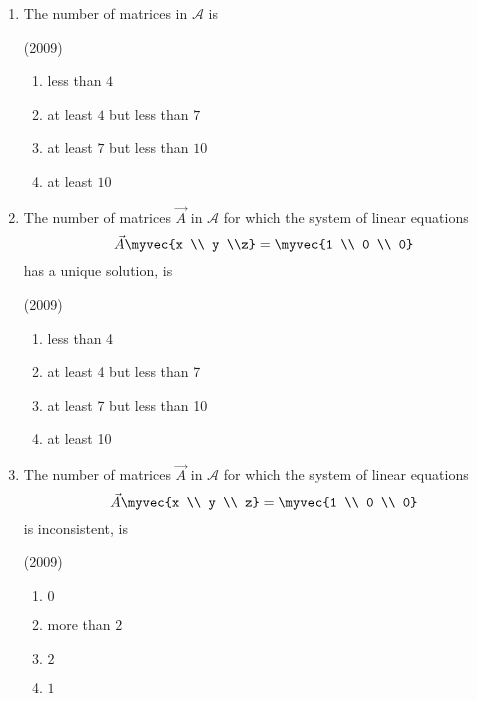 \begin{enumerate}
	\begin{enumerate}
		\item The number of matrices in $\mathcal{A}$ is

			\hfill(2009)

			\begin{enumerate}
				\item less than $4$
				\item at least $4$ but less than $7$
				\item at least $7$ but less than $10$
				\item at least $10$
			\end{enumerate}
		
		\item The number of matrices $\vec{A}$ in $\mathcal{A}$ for which the system of linear equations
			$$\vec{A}\myvec{x \\ y \\z}=\myvec{1 \\ 0 \\ 0}$$
			has a unique solution, is

			\hfill(2009)

			\begin{enumerate}
				\item less than 4
				\item at least 4 but less than 7
				\item at least 7 but less than 10
				\item at least 10
			\end{enumerate}

		\item The number of matrices $\vec{A}$ in $\mathcal{A}$ for which the system of linear equations
			$$\vec{A}\myvec{x \\ y \\ z}=\myvec{1 \\ 0 \\ 0}$$
			is inconsistent, is

			\hfill(2009)

			\begin{enumerate}
				\item $0$
				\item more than $2$
				\item $2$
				\item $1$
			\end{enumerate}
	\end{enumerate}




\end{enumerate}
